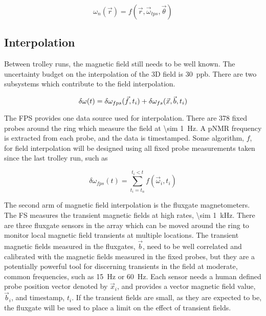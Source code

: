 \begin{equation}
\label{eqn:field-3d-trolley}
\omega_{n}(\vec{r}) = f(\vec{r}, \vec{\omega}_{tps}, \vec{\theta})
\end{equation}

\subsection{Interpolation}

Between trolley runs, the magnetic field still needs to be well known.  The uncertainty budget on the interpolation of the 3D field is \SI{30}{ppb}.  There are two subsystems which contribute to the field interpolation.

\begin{equation}
\label{eqn:field-interpolation}
\delta \omega(t) = \delta \omega_{fps}(\vec{f}, t_i) \\
+ \delta \omega_{fs}(\vec{x}, \vec{b}, t_i)
\end{equation}

The FPS provides one data source used for interpolation.  There are 378 fixed probes around the ring which measure the field at \SI{\sim 1}{\Hz}.  A pNMR frequency is extracted from each probe, and the data is timestamped.  Some algorithm, $f$, for field interpolation will be designed using all fixed probe measurements taken since the last trolley run, such as

\begin{equation}
\label{eqn:field-interpolation-fps}
\delta \omega_{fps}(t) = \sum_{t_i = t_n}^{t_i < t} f(\vec{\omega}_i, t_i)
\end{equation}

The second arm of magnetic field interpolation is the fluxgate magnetometers.  The FS measures the transient magnetic fields at high rates, \SI{\sim 1}{\kHz}.  There are three fluxgate sensors in the array which can be moved around the ring to monitor local magnetic field transients at multiple locations.  The transient magnetic fields measured in the fluxgates, $\vec{b}$, need to be well correlated and calibrated with the magnetic fields measured in the fixed probes, but they are a potentially powerful tool for discerning transients in the field at moderate, common frequencies, such as \SI{15}{\Hz} or \SI{60}{\Hz}.  Each sensor needs a human defined probe position vector denoted by $\vec{x}_i$, and provides a vector magnetic field value, $\vec{b}_i$, and timestamp, $t_i$.  If the transient fields are small, as they are expected to be, the fluxgate will be used to place a limit on the effect of transient fields.

